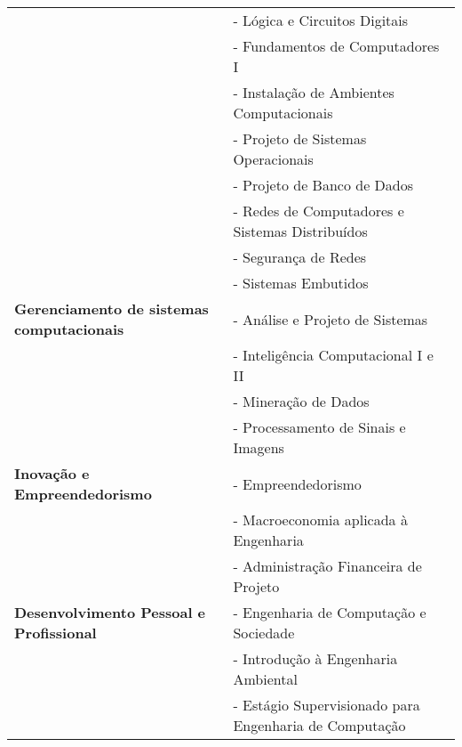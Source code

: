\begin{table}[ht]
\begin{tabular}{l l}
    & - Lógica e Circuitos Digitais \\ 
    
    & - Fundamentos de Computadores I \\ 
    
    & - Instalação de Ambientes Computacionais \\ 
    
    & - Projeto de Sistemas Operacionais \\ 
    
    & - Projeto de Banco de Dados \\ 
    
    & - Redes de Computadores e Sistemas Distribuídos \\ 
    
    & - Segurança de Redes \\ 
    
    & - Sistemas Embutidos \\ 
    
    \hline
    
    \textbf{Gerenciamento de sistemas computacionais} 
    & - Análise e Projeto de Sistemas \\
    
    & - Inteligência Computacional I e II \\ 
    
    & - Mineração de Dados \\ 
    
    & - Processamento de Sinais e Imagens\\
    
    \hline
    
    \textbf{Inovação e Empreendedorismo } 
    & - Empreendedorismo \\ 
    
    & - Macroeconomia aplicada à Engenharia \\ 
    
    & - Administração Financeira de Projeto \\
    
    \hline
    
    \textbf{Desenvolvimento Pessoal e Profissional}
    & - Engenharia de Computação e Sociedade \\ 
    
    & - Introdução à Engenharia Ambiental \\ 
    
    & - Estágio Supervisionado para Engenharia de Computação \\
    
    \hline
    
\end{tabular}
\end{table} 


